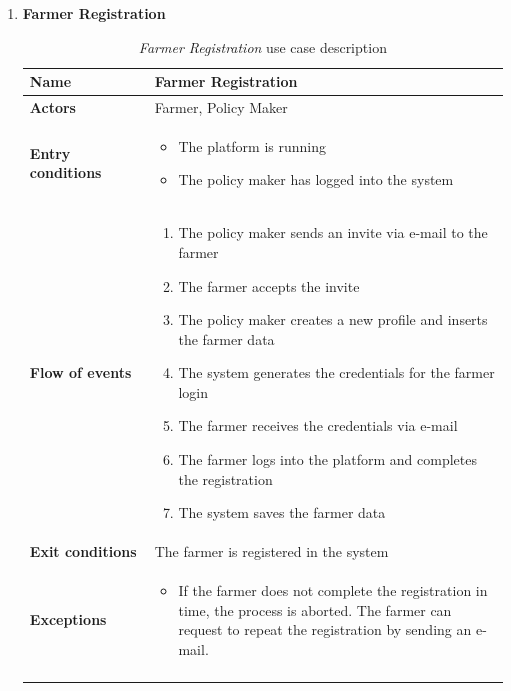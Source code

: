 \documentclass[10pt]{article}
\begin{document}
\begin{enumerate}[label=\textbf{UC\arabic*}]
    \newpage
    \item \label{uc:uc2} \textbf{Farmer Registration} 
        \begin{longtable}{p{0.26\linewidth}p{0.75\linewidth}}
            \toprule
            \textbf{Name} & \textbf{Farmer Registration} \\
            \midrule
            \textbf{Actors} & Farmer, Policy Maker \\
            \midrule
            \textbf{Entry conditions} & 
            \begin{itemize}
                \item The platform is running
                \item The policy maker has logged into the system
            \end{itemize}\\
            \midrule
            \textbf{Flow of events} & 
            \begin{enumerate}
                \item The policy maker sends an invite via e-mail to the farmer
                \item The farmer accepts the invite 
                \item The policy maker creates a new profile and inserts the farmer data
                \item The system generates the credentials for the farmer login
                \item The farmer receives the credentials via e-mail
                \item The farmer logs into the platform and completes the registration
                \item The system saves the farmer data
            \end{enumerate} \\
            \midrule
            \textbf{Exit conditions} & The farmer is registered in the system\\
            \midrule
            \textbf{Exceptions} & 
            \begin{itemize}
                \item If the farmer does not complete the registration in time, the process is aborted. The farmer can request to repeat the registration by sending an e-mail.
            \end{itemize} \\
            \bottomrule
            \caption{\emph{Farmer Registration} use case description}
        \end{longtable}

\end{enumerate}
\end{document}
